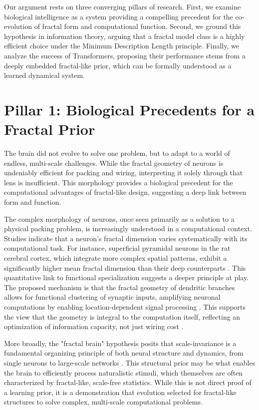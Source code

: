 \documentclass[11pt,a4paper]{article}
\begin{document}
Our argument rests on three converging pillars of research. First, we examine biological intelligence as a system providing a compelling precedent for the co-evolution of fractal form and computational function. Second, we ground this hypothesis in information theory, arguing that a fractal model class is a highly efficient choice under the Minimum Description Length principle. Finally, we analyze the success of Transformers, proposing their performance stems from a deeply embedded fractal-like prior, which can be formally understood as a learned dynamical system.

\section{Pillar 1: Biological Precedents for a Fractal Prior}
The brain did not evolve to solve one problem, but to adapt to a world of endless, multi-scale challenges. While the fractal geometry of neurons is undeniably efficient for packing and wiring, interpreting it solely through that lens is insufficient. This morphology provides a  biological precedent for the computational advantages of fractal-like design, suggesting a deep link between form and function.

The complex morphology of neurons, once seen primarily as a solution to a physical packing problem, is increasingly understood in a computational context. Studies indicate that a neuron's fractal dimension varies systematically with its computational task. For instance, superficial pyramidal neurons in the rat cerebral cortex, which integrate more complex spatial patterns, exhibit a significantly higher mean fractal dimension than their deep counterparts \citep{jelinek2015differences}. This quantitative link to functional specialization suggests a deeper principle at play. The proposed mechanism is that the fractal geometry of dendritic branches allows for functional clustering of synaptic inputs, amplifying neuronal computations by enabling location-dependent signal processing \citep{ecker2023dendritic}. This supports the view that the geometry is integral to the computation itself, reflecting an optimization of information capacity, not just wiring cost \citep{smith2021neurons}.

More broadly, the "fractal brain" hypothesis posits that scale-invariance is a fundamental organizing principle of both neural structure and dynamics, from single neurons to large-scale networks \citep{grosu2023fractal}. This structural prior may be what enables the brain to efficiently process naturalistic stimuli, which themselves are often characterized by fractal-like, scale-free statistics. While this is not direct proof of a learning prior, it is a  demonstration that evolution selected for fractal-like structures to solve complex, multi-scale computational problems.
\end{document}
